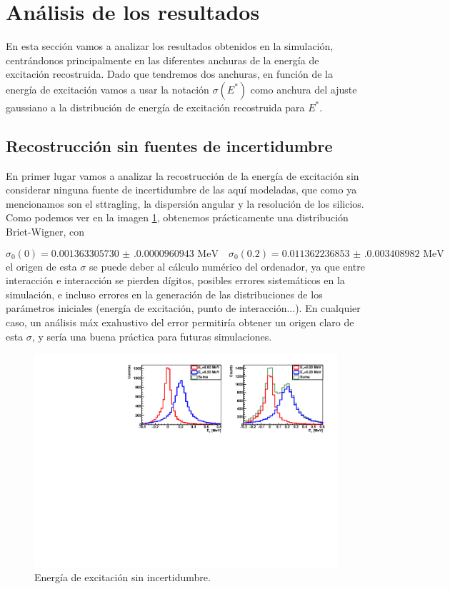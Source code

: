 \section{Análisis de los resultados}

En esta sección vamos a analizar los resultados obtenidos en la simulación, centrándonos principalmente en las diferentes anchuras de la energía de excitación recostruida. Dado que tendremos dos anchuras, en función de la energía de excitación vamos a usar la notación $\sigma(E^*)$ como anchura del ajuste gaussiano a la distribución de energía de excitación recostruida para $E^*$.  

\subsection{Recostrucción sin fuentes de incertidumbre}

En primer lugar vamos a analizar la recostrucción de la energía de excitación sin considerar ninguna fuente de incertidumbre de las aquí modeladas, que como ya mencionamos son el sttragling, la dispersión angular y la resolución de los silicios. Como podemos ver en la imagen \cref{Fig:05-RecExcIdx3}, obtenemos prácticamente una distribución Briet-Wigner, con 

\begin{equation}
    \sigma_{0} (0) = \num{0.001363305730(0.0000960943)} \text{ MeV} \quad 
    \sigma_{0} (0.2) = \num{0.011362236853(0.0034089820)} \text{ MeV}
\end{equation} 
el origen de esta $\sigma$ se puede deber al cálculo numérico del ordenador, ya que entre interacción e interacción se pierden dígitos, posibles errores sistemáticos en la simulación, e incluso errores en la generación de las distribuciones de los parámetros iniciales (energía de excitación, punto de interacción...). En cualquier caso, un análisis máx exahustivo del error permitiría obtener un origen claro de esta $\sigma$, y sería una buena práctica para futuras simulaciones.

\vspace*{-0.25cm}
\begin{figure}[H]
    \centering
    \includegraphics[width=1\textwidth]{Imagenes/Rec_incIdx3_single.pdf}
    \caption{Energía de excitación sin incertidumbre.}
    \label{Fig:05-RecExcIdx3}
\end{figure}

